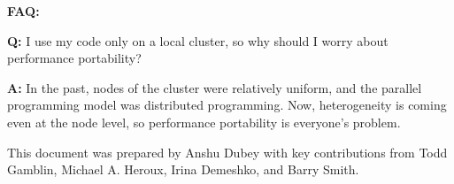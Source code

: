 \documentclass[]{article}
\begin{document}
\textbf{FAQ:}

\textbf{Q:} I use my code only on a local cluster, so why should I worry
about performance portability?

\textbf{A:} In the past, nodes of the cluster were relatively uniform,
and the parallel programming model was distributed programming. Now,
heterogeneity is coming even at the node level, so performance
portability is everyone's problem.

This document was prepared by Anshu Dubey with key contributions from
Todd Gamblin, Michael A. Heroux, Irina Demeshko, and Barry Smith.
\end{document}
